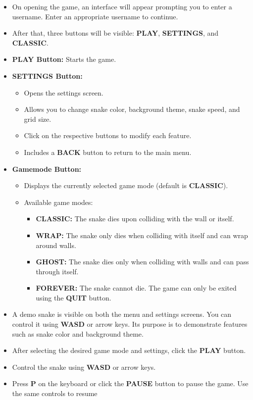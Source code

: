 \begin{itemize}
\item On opening the game, an interface will appear prompting you to enter a username. Enter an appropriate username to continue.
\item After that, three buttons will be visible: \textbf{PLAY}, \textbf{SETTINGS}, and \textbf{CLASSIC}.
\item \textbf{PLAY Button:} Starts the game.
\item \textbf{SETTINGS Button:} 
\begin{itemize}
    \item Opens the settings screen.
    \item Allows you to change snake color, background theme, snake speed, and grid size.
    \item Click on the respective buttons to modify each feature.
    \item Includes a \textbf{BACK} button to return to the main menu.
\end{itemize}
\item \textbf{Gamemode Button:}
\begin{itemize}
    \item Displays the currently selected game mode (default is \textbf{CLASSIC}).
    \item Available game modes:
    \begin{itemize}
        \item \textbf{CLASSIC:} The snake dies upon colliding with the wall or itself.
    \item \textbf{WRAP:} The snake only dies when colliding with itself and can wrap around walls.
       \item \textbf{GHOST:} The snake dies only when colliding with walls and can pass through itself.
      \item \textbf{FOREVER:} The snake cannot die. The game can only be exited using the \textbf{QUIT} button.
    \end{itemize}
\end{itemize}
\item A demo snake is visible on both the menu and settings screens. You can control it using \textbf{WASD} or arrow keys. Its purpose is to demonstrate features such as snake color and background theme.
\item After selecting the desired game mode and settings, click the \textbf{PLAY} button.
\item Control the snake using \textbf{WASD} or arrow keys.
\item Press \textbf{P} on the keyboard or click the \textbf{PAUSE} button to pause the game. Use the same controls to resume

\end{itemize}
